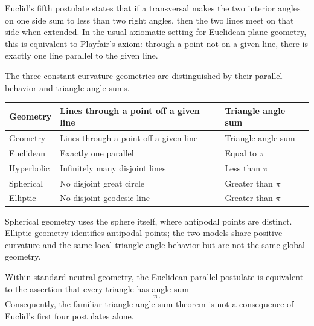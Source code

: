     \begin{fact}
        Euclid's fifth postulate states that if a transversal makes the two
        interior angles on one side sum to less than two right angles, then the
        two lines meet on that side when extended. In the usual axiomatic setting
        for Euclidean plane geometry, this is equivalent to Playfair's axiom:
        through a point not on a given line, there is exactly one line parallel
        to the given line.
    \end{fact}

    \begin{definition}
        The three constant-curvature geometries are distinguished by their
        parallel behavior and triangle angle sums.
        \begin{longtable}{@{}L{0.22\textwidth}L{0.34\textwidth}L{0.30\textwidth}@{}}
            \toprule
            Geometry & Lines through a point off a given line & Triangle angle sum \\
            \midrule
            \endfirsthead

            \toprule
            Geometry & Lines through a point off a given line & Triangle angle sum \\
            \midrule
            \endhead

            \bottomrule
            \endlastfoot

            Euclidean & Exactly one parallel & Equal to $\pi$ \\
            Hyperbolic & Infinitely many disjoint lines & Less than $\pi$ \\
            Spherical & No disjoint great circle & Greater than $\pi$ \\
            Elliptic & No disjoint geodesic line & Greater than $\pi$ \\
        \end{longtable}
        Spherical geometry uses the sphere itself, where antipodal points are
        distinct. Elliptic geometry identifies antipodal points; the two models
        share positive curvature and the same local triangle-angle behavior but
        are not the same global geometry.
    \end{definition}

    \begin{theorem}
        Within standard neutral geometry, the Euclidean parallel postulate is
        equivalent to the assertion that every triangle has angle sum
        \[
            \pi.
        \]
        Consequently, the familiar triangle angle-sum theorem is not a
        consequence of Euclid's first four postulates alone.
    \end{theorem}

